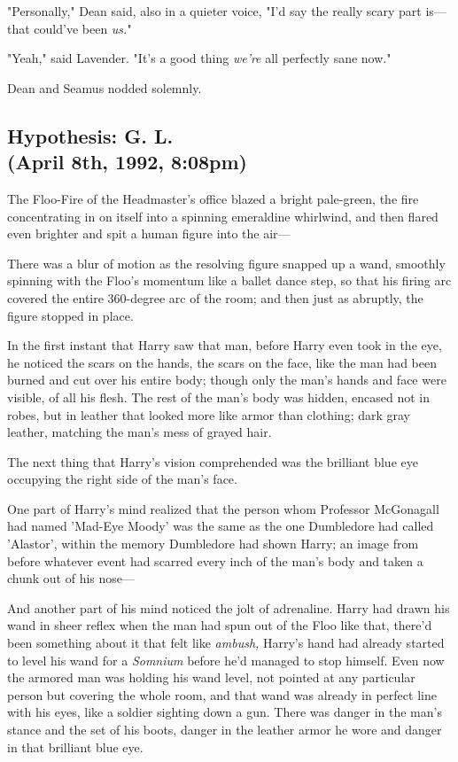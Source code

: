 "Personally," Dean said, also in a quieter voice, "I'd say the really scary 
part is---that could've been \emph{us.}"

"Yeah," said Lavender. "It's a good thing \emph{we're} all perfectly sane now."

Dean and Seamus nodded solemnly.
\sbreak
\subsection{Hypothesis: G. L.\\
(April 8th, 1992, 8:08pm)}

The Floo-Fire of the Headmaster's office blazed a bright pale-green, the fire 
concentrating in on itself into a spinning emeraldine whirlwind, and then 
flared even brighter and spit a human figure into the air---

There was a blur of motion as the resolving figure snapped up a wand, smoothly 
spinning with the Floo's momentum like a ballet dance step, so that his firing 
arc covered the entire 360-degree arc of the room; and then just as abruptly, 
the figure stopped in place.

In the first instant that Harry saw that man, before Harry even took in the 
eye, he noticed the scars on the hands, the scars on the face, like the man had 
been burned and cut over his entire body; though only the man's hands and face 
were visible, of all his flesh. The rest of the man's body was hidden, encased 
not in robes, but in leather that looked more like armor than clothing; dark 
gray leather, matching the man's mess of grayed hair.

The next thing that Harry's vision comprehended was the brilliant blue eye 
occupying the right side of the man's face.

One part of Harry's mind realized that the person whom Professor McGonagall had 
named 'Mad-Eye Moody' was the same as the one Dumbledore had called 'Alastor', 
within the memory Dumbledore had shown Harry; an image from before whatever 
event had scarred every inch of the man's body and taken a chunk out of his 
nose---

And another part of his mind noticed the jolt of adrenaline. Harry had drawn 
his wand in sheer reflex when the man had spun out of the Floo like that, 
there'd been something about it that felt like \emph{ambush,} Harry's hand had 
already started to level his wand for a \emph{Somnium} before he'd managed to 
stop himself. Even now the armored man was holding his wand level, not pointed 
at any particular person but covering the whole room, and that wand was already 
in perfect line with his eyes, like a soldier sighting down a gun. There was 
danger in the man's stance and the set of his boots, danger in the leather 
armor he wore and danger in that brilliant blue eye.

